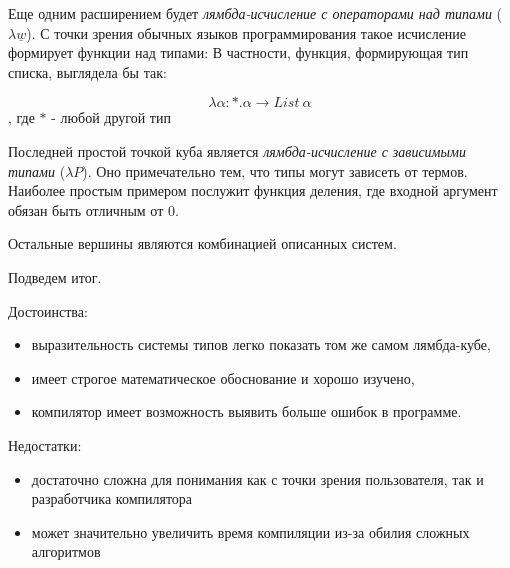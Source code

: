 Еще одним расширением будет \textit{лямбда-исчисление с операторами над типами} ($\lambda \underline{w}$).
С точки зрения обычных языков программирования такое исчисление формирует функции над типами:
В частности, функция, формирующая тип списка, выглядела бы так:

\begin{equation}
    \label{eq:WTLC}
    \lambda \alpha: *. \alpha \to List ~\alpha
\end{equation}, где $*$ - любой другой тип

Последней простой точкой куба является \textit{лямбда-исчисление с зависимыми типами} ($\lambda P$).
Оно примечательно тем, что типы могут зависеть от термов.
Наиболее простым примером послужит функция деления, где входной аргумент обязан быть отличным от $0$.

Остальные вершины являются комбинацией описанных систем.

Подведем итог.

Достоинства:
\begin{itemize}
    \item выразительность системы типов легко показать том же самом лямбда-кубе,
    \item имеет строгое математическое обоснование и хорошо изучено,
    \item компилятор имеет возможность выявить больше ошибок в программе.
\end{itemize}

Недостатки:
\begin{itemize}
    \item достаточно сложна для понимания как с точки зрения пользователя, так и разработчика компилятора
    \item может значительно увеличить время компиляции из-за обилия сложных алгоритмов
\end{itemize}

